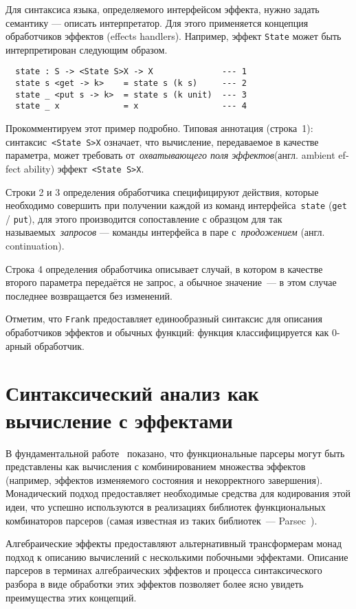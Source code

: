 \documentclass [a4paper] {article}
\begin{document}
Для синтаксиса языка, определяемого интерфейсом эффекта, нужно задать
семантику --- описать интерпретатор. Для этого применяется концепция
обработчиков эффектов  (effects handlers). Например, эффект \texttt{State}
может быть интерпретирован следующим образом.
\begin{verbatim}
  state : S -> <State S>X -> X              --- 1
  state s <get -> k>    = state s (k s)     --- 2
  state _ <put s -> k>  = state s (k unit)  --- 3
  state _ x             = x                 --- 4
\end{verbatim}

Прокомментируем этот пример подробно. Типовая аннотация (строка~1): синтаксис~\texttt{<State S>X} означает, что вычисление, передаваемое в качестве параметра, может
требовать от~\emph{охватывающего поля эффектов}(англ. \foreignlanguage{english}{ambient effect ability}) эффект~\texttt{<State S>X}.

Строки 2 и 3 определения обработчика специфицируют действия, которые необходимо совершить при получении каждой из команд интерфейса~\texttt{state} (\texttt{get} / \texttt{put}),
для этого производится сопоставление с образцом для так называемых~\emph{запросов} --- команды интерфейса в паре с~\emph{продожением} (англ. continuation).

Строка 4 определения обработчика описывает случай, в котором в качестве второго параметра передаётся не запрос, а обычное значение~--- в этом случае последнее возвращается без изменений.

Отметим, что \texttt{Frank} предоставляет единообразный синтаксис для описания обработчиков эффектов и обычных функций: функция классифицируется как 0-арный обработчик.

\section{Синтаксический анализ как вычисление с эффектами}

В фундаментальной работе~\cite{monParsing} показано, что функциональные парсеры могут быть представлены как вычисления с комбинированием множества эффектов (например, эффектов изменяемого состояния и некорректного завершения). Монадический подход предоставляет
необходимые средства для кодирования этой идеи, что успешно используются в реализациях библиотек
функциональных комбинаторов парсеров (самая известная из таких библиотек~--- Parsec~\cite{parsec}).

Алгебраические эффекты предоставляют альтернативный трансформерам монад подход к
описанию вычислений с несколькими побочными эффектами. Описание парсеров в
терминах алгебраических эффектов и процесса синтаксического разбора в виде
обработки этих эффектов позволяет более ясно увидеть преимущества этих концепций.
\end{document}
